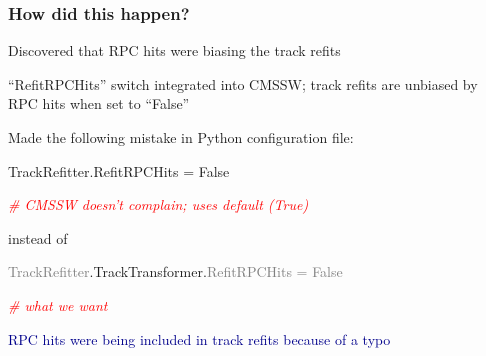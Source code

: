 \documentclass[compress]{beamer}
\begin{document}
\begin{frame}
\frametitle{How did this happen?}
\begin{description}\setlength{\itemsep}{0.3 cm}
\item[Feb 2007:] Discovered that RPC hits were biasing the track refits

\item[Aug 2007:] ``RefitRPCHits'' switch integrated into CMSSW; track
  refits are unbiased by RPC hits when set to ``False''

\item[$\begin{array}{c} \mbox{sometime} \\ \mbox{thereafter:} \end{array}$] Made the following mistake in Python configuration file:

TrackRefitter.RefitRPCHits = False

\hfill \textcolor{red}{\it \# CMSSW doesn't complain; uses default (True)}

\vspace{0.25 cm}
instead of

\vspace{0.25 cm}
\textcolor{gray}{TrackRefitter}.TrackTransformer.\textcolor{gray}{RefitRPCHits = False}

\hfill \textcolor{red}{\it \# what we want}
\end{description}

\textcolor{darkblue}{RPC hits were being included in track refits because of a typo}
\end{frame}
\end{document}
